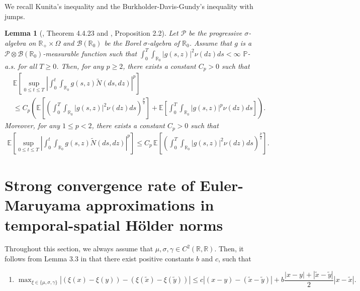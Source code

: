 \documentclass[11pt]{article}
\theoremstyle{theorem}
\newtheorem{Lem}[Def]{Lemma}
\theoremstyle{definition}
\newcommand{\pr}{\mathbb{P}}
\newcommand{\1}{{\bf 1}}
\begin{document}
We recall Kunita's inequality and the Burkholder-Davis-Gundy's inequality with jumps.
\begin{Lem}[\cite{A59}, Theorem 4.4.23  and \cite{Zhu}, Proposition 2.2]
	\label{BDGjump}  Let $\mathcal{P}$ be the progressive $\sigma$-algebra on $\mathbb{R}_+\times\Omega$ and $\mathcal{B}(\mathbb{R}_0)$ be the Borel $\sigma$-algebra of \;$\mathbb{R}_0$. Assume that $g$ is a $\mathcal{P}\otimes \mathcal{B}(\mathbb{R}_0)$-measurable function such that $\int_0^T\int_{\mathbb{R}_0}\vert g(s,z) \vert^2\nu(dz)ds<\infty$ $\pr$-a.s. for all $T\geq 0$. Then, for any $p\geq 2$, there exists a constant $C_p >0$ such that
	\begin{align*}
		&\mathbb{E}\left[\sup_{0\leq t \leq T}\left\vert \int_0^t\int_{\mathbb{R}_0} g(s,z) \widetilde{N}(d s, d z)\right\vert^p\right]\\
		&\leq C_p \left(\mathbb{E}\left[\left(\int_0^T\int_{\mathbb{R}_0} \vert g(s,z) \vert^2 \nu(dz)ds\right)^{\frac{p}{2}}\right]+\mathbb{E}\left[\int_0^T\int_{\mathbb{R}_0} \vert g(s,z) \vert^p \nu(dz)ds\right]\right).
	\end{align*}
	Moreover, for any $1\leq p<2$, there exists a constant $C_p >0$ such that
	\begin{align*}
		\mathbb{E}\left[\sup_{0\leq t \leq T}\left\vert \int_0^t\int_{\mathbb{R}_0} g(s,z) \widetilde{N}(d s, d z)\right\vert^p\right]\leq C_p \, \mathbb{E}\left[\left(\int_0^T\int_{\mathbb{R}_0} \vert g(s,z) \vert^2 \nu(dz)ds\right)^{\frac{p}{2}}\right].
	\end{align*}	
\end{Lem}

\section{Strong convergence rate of Euler-Maruyama approximations in temporal-spatial H\"older norms}
\label{mainresult}
Throughout this section, we always assume that $\mu, \sigma, \gamma \in C^2(\mathbb{R}, \mathbb{R})$. Then, it follows from Lemma 3.3 in \cite{HN22} that there exist positive constants $b$ and $c$,   such that  
\begin{enumerate}
\item[\bf A1.] $\max_{\xi \in \{\mu, \sigma, \gamma\}} \left|(\xi(x)-\xi(y))-(\xi(\widetilde{x})-\xi(\widetilde{y}))\right|\leq c|(x-y)- (\widetilde{x}- \widetilde{y})|+ b \dfrac{|x-y|+|\widetilde{x}-\widetilde{y}|}{2}|x-\widetilde{x}|.$
\end{enumerate} 
\end{document}
